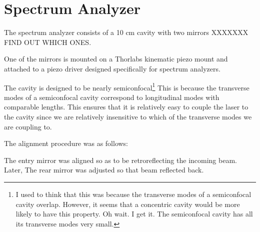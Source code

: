 \section{Spectrum Analyzer}

The spectrum analyzer consists of a 10 cm cavity with two mirrors XXXXXXX FIND OUT WHICH ONES. 

One of the mirrors is mounted on a Thorlabs kinematic piezo mount and attached to a piezo driver designed specifically for spectrum analyzers.

The cavity is designed to be nearly semiconfocal\footnote{I used to think that this was because the transverse modes of a semiconfocal cavity overlap. However, it seems that a concentric cavity would be more likely to have this property. Oh wait. I get it. The semiconfocal cavity has all its transverse modes very small.} This is because the transverse modes of a semiconfocal cavity correspond to longitudinal modes with comparable lengths. This ensures that it is relatively easy to couple the laser to the cavity since we are relatively insensitive to which of the transverse modes we are coupling to. 


The alignment procedure was as follows:

The entry mirror was aligned so as to be retroreflecting the incoming beam. Later, The rear mirror was adjusted so that beam reflected back. 
